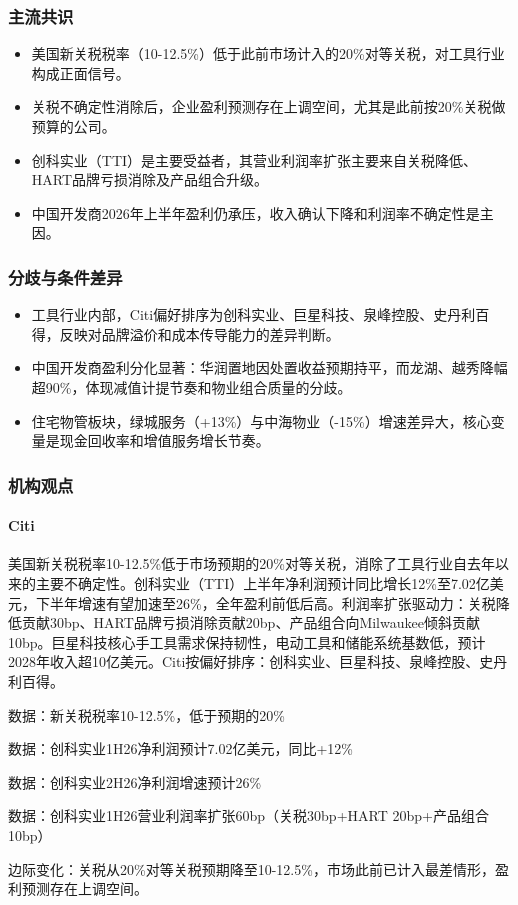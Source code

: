 \documentclass[11pt]{ctexart}
\begin{document}
\subsubsection*{主流共识}
\begin{itemize}
  \item 美国新关税税率（10-12.5\%）低于此前市场计入的20\%对等关税，对工具行业构成正面信号。
  \item 关税不确定性消除后，企业盈利预测存在上调空间，尤其是此前按20\%关税做预算的公司。
  \item 创科实业（TTI）是主要受益者，其营业利润率扩张主要来自关税降低、HART品牌亏损消除及产品组合升级。
  \item 中国开发商2026年上半年盈利仍承压，收入确认下降和利润率不确定性是主因。
\end{itemize}
\subsubsection*{分歧与条件差异}
\begin{itemize}
  \item 工具行业内部，Citi偏好排序为创科实业、巨星科技、泉峰控股、史丹利百得，反映对品牌溢价和成本传导能力的差异判断。
  \item 中国开发商盈利分化显著：华润置地因处置收益预期持平，而龙湖、越秀降幅超90\%，体现减值计提节奏和物业组合质量的分歧。
  \item 住宅物管板块，绿城服务（+13\%）与中海物业（-15\%）增速差异大，核心变量是现金回收率和增值服务增长节奏。
\end{itemize}
\subsubsection*{机构观点}
\paragraph{Citi} 美国新关税税率10-12.5\%低于市场预期的20\%对等关税，消除了工具行业自去年以来的主要不确定性。创科实业（TTI）上半年净利润预计同比增长12\%至7.02亿美元，下半年增速有望加速至26\%，全年盈利前低后高。利润率扩张驱动力：关税降低贡献30bp、HART品牌亏损消除贡献20bp、产品组合向Milwaukee倾斜贡献10bp。巨星科技核心手工具需求保持韧性，电动工具和储能系统基数低，预计2028年收入超10亿美元。Citi按偏好排序：创科实业、巨星科技、泉峰控股、史丹利百得。
{\small\color{refgray}数据：新关税税率10-12.5\%，低于预期的20\%\par}
{\small\color{refgray}数据：创科实业1H26净利润预计7.02亿美元，同比+12\%\par}
{\small\color{refgray}数据：创科实业2H26净利润增速预计26\%\par}
{\small\color{refgray}数据：创科实业1H26营业利润率扩张60bp（关税30bp+HART 20bp+产品组合10bp）\par}
{\small\color{refgray}边际变化：关税从20\%对等关税预期降至10-12.5\%，市场此前已计入最差情形，盈利预测存在上调空间。\par}
\end{document}

